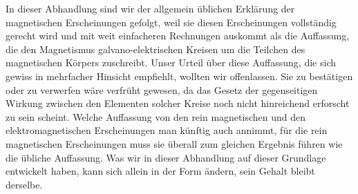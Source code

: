 In dieser Abhandlung sind wir der allgemein üblichen Erklärung der magnetischen Erscheinungen gefolgt, weil sie diesen Erscheinungen vollständig gerecht wird und mit weit einfacheren Rechnungen auskommt als die Auffassung, die den Magnetismus galvano-elektrischen Kreisen um die Teilchen des magnetischen Körpers zuschreibt. Unser Urteil über diese Auffassung, die sich gewiss in mehrfacher Hinsicht empfiehlt, wollten wir offenlassen. Sie zu bestätigen oder zu verwerfen wäre verfrüht gewesen, da das Gesetz der gegenseitigen Wirkung zwischen den Elementen solcher Kreise noch nicht hinreichend erforscht zu sein scheint. Welche Auffassung von den rein magnetischen und den elektromagnetischen Erscheinungen man künftig auch annimmt, für die rein magnetischen Erscheinungen muss sie überall zum gleichen Ergebnis führen wie die übliche Auffassung. Was wir in dieser Abhandlung auf dieser Grundlage entwickelt haben, kann sich allein in der Form ändern, sein Gehalt bleibt derselbe.
